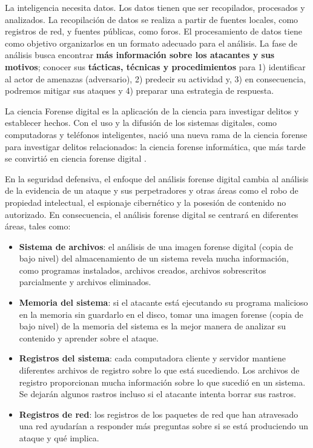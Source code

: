 La inteligencia necesita datos. Los datos tienen que ser recopilados, procesados y analizados. La recopilación de datos se realiza a partir de fuentes locales, como registros de red, y fuentes públicas, como foros. El procesamiento de datos tiene como objetivo organizarlos en un formato adecuado para el análisis. La fase de análisis busca encontrar \textbf{más información sobre los atacantes y sus motivos}; conocer sus \textbf{tácticas, técnicas y procedimientos} para 1) identificar  al actor de amenazas (adversario), 2) predecir su actividad y, 3) en consecuencia, podremos mitigar sus ataques y 4) preparar una estrategia de respuesta.

La ciencia Forense digital es la aplicación de la ciencia para investigar delitos y establecer hechos. Con el uso y la difusión de los sistemas digitales, como computadoras y teléfonos inteligentes, nació una nueva rama de la ciencia forense para investigar delitos relacionados: la ciencia forense informática, que más tarde se convirtió en ciencia forense digital .

En la seguridad defensiva, el enfoque del análisis forense digital cambia al análisis de la evidencia de un ataque y sus perpetradores y otras áreas como el robo de propiedad intelectual, el espionaje cibernético y la posesión de contenido no autorizado. En consecuencia, el análisis forense digital se centrará en diferentes áreas, tales como:
\begin{itemize}
\item \textbf{Sistema de archivos}: el análisis de una imagen forense digital (copia de bajo nivel) del almacenamiento de un sistema revela mucha información, como programas instalados, archivos creados, archivos sobrescritos parcialmente y archivos eliminados.
\item \textbf{Memoria del sistema}: si el atacante está ejecutando su programa malicioso en la memoria sin guardarlo en el disco, tomar una imagen forense (copia de bajo nivel) de la memoria del sistema es la mejor manera de analizar su contenido y aprender sobre el ataque.
\item \textbf{Registros del sistema}: cada computadora cliente y servidor mantiene diferentes archivos de registro sobre lo que está sucediendo. Los archivos de registro proporcionan mucha información sobre lo que sucedió en un sistema. Se dejarán algunos rastros incluso si el atacante intenta borrar sus rastros.
\item \textbf{Registros de red}: los registros de los paquetes de red que han atravesado una red ayudarían a responder más preguntas sobre si se está produciendo un ataque y qué implica.
\end{itemize}


